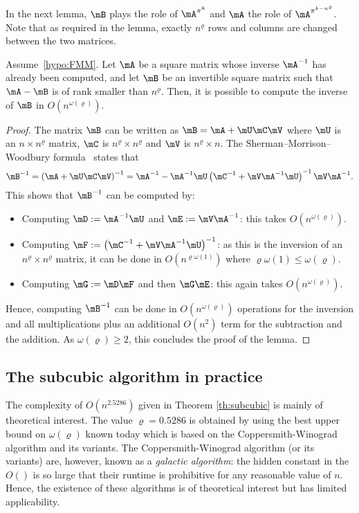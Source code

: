 In the next lemma, $\mB$ plays the role of $\mA^{\pi^k}$ and $\mA$ the role of $\mA^{\pi^{k- n^{\varrho} }}$. Note that as required in the lemma, exactly $ n^\varrho $ rows and columns are changed between the two matrices.
\begin{lem}
    \label{lem:woodbury}
    Assume~\ref{hypo:FMM}. Let $\mA$ be a square matrix whose inverse $\mA^{-1}$ has already been computed, and let $\mB$ be an invertible square matrix such that $\mA-\mB$ is of rank smaller than $ n^{\varrho} $. Then, it is possible to compute the inverse of $\mB$ in $O(n^{\omega(\varrho)})$. 
\end{lem}
\begin{proof}
    The matrix $\mB$ can be written as $\mB=\mA + \mU\mC\mV$ where $\mU$ is an $n\times n^\varrho $ matrix, $\mC$ is $ n^\varrho \times n^\varrho $ and $\mV$ is $ n^\varrho \times n$. The Sherman–Morrison–Woodbury formula~\cite{woodbury1950inverting} states that
    \begin{align*}
        \mB^{-1} = \left(\mA + \mU\mC\mV \right)^{-1} = \mA^{-1} - \mA^{-1}\mU \left(\mC^{-1} + \mV\mA^{-1}\mU \right)^{-1} \mV\mA^{-1}.
    \end{align*}
    This shows that $\mB^{-1}$ can be computed by:
    \begin{itemize}
        \item Computing $\mD:=\mA^{-1}\mU$ and $\mE:=\mV\mA^{-1}$: this takes $O(n^{\omega(\varrho)})$. 
        \item Computing $\mF:=\left(\mC^{-1} + \mV\mA^{-1}\mU \right)^{-1}$: as this is the inversion of an $ n^\varrho \times n^\varrho $ matrix, it can be done in $O(n^{\varrho\omega(1)})$ where $\varrho\omega(1)\le \omega(\varrho)$.
        \item Computing $\mG:=\mD\mF$ and then $\mG\mE$: this again takes $O(n^{\omega(\varrho)})$. 
    \end{itemize}
    Hence, computing $\mB^{-1}$ can be done in $O(n^{\omega(\varrho)})$ operations for the inversion and all   multiplications plus an additional $O(n^2)$ term for the subtraction and the addition. As $\omega(\varrho)\ge2$, this concludes the proof of the lemma.
\end{proof}

\subsection{The subcubic algorithm in practice}

The complexity of $O(n^{2.5286})$ given in Theorem \ref{th:subcubic} is mainly of theoretical interest. The value $\varrho = 0.5286$ is obtained by using the best upper bound  on $\omega(\varrho)$ known today which is based on the Coppersmith-Winograd algorithm and its variants. The Coppersmith-Winograd algorithm (or its variants) are, however, known as a \emph{galactic algorithm}: the hidden constant in the $O()$ is so large that their runtime is prohibitive for any reasonable value of $n$. Hence, the existence of these algorithms is of theoretical interest but has limited applicability.

